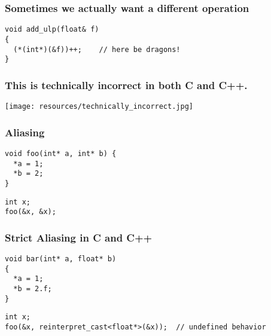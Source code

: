 \documentclass[aspectratio=169]{beamer}
\newif\iftransitions
\begin{document}
\begin{frame}[fragile]

  \frametitle{Sometimes we actually want a different operation}
  
  \begin{lstlisting}
void add_ulp(float& f)
{
  (*(int*)(&f))++;    // here be dragons!
}
  \end{lstlisting}
\end{frame}

\begin{frame}
  \frametitle{This is technically incorrect in both C and C++.}

  \begin{center}
  \texttt{[image: resources/technically\_incorrect.jpg]}
  \end{center}
\end{frame}


\begin{frame}[fragile]
  \frametitle{Aliasing}

  \iftransitions \pause \fi



  \begin{lstlisting}
void foo(int* a, int* b) {
  *a = 1;
  *b = 2;
}
  \end{lstlisting}
  \iftransitions \pause \fi
  \begin{lstlisting}
int x;
foo(&x, &x);
  \end{lstlisting}




\end{frame}


\begin{frame}[fragile]
  \frametitle{Strict Aliasing in C and C++}


  
  \begin{lstlisting}
void bar(int* a, float* b)
{
  *a = 1;
  *b = 2.f;
}
  \end{lstlisting}
  \begin{lstlisting}
int x;
foo(&x, reinterpret_cast<float*>(&x));  // undefined behavior
  \end{lstlisting}
  
\end{frame}
\end{document}
